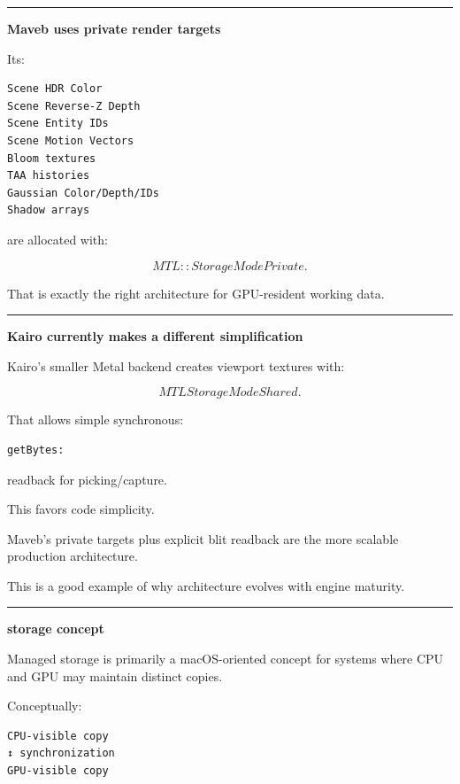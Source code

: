\begin{center}\rule{0.5\linewidth}{0.5pt}\end{center}

\textbf{Maveb uses private render targets}

Its:

\begin{verbatim}
Scene HDR Color
Scene Reverse-Z Depth
Scene Entity IDs
Scene Motion Vectors
Bloom textures
TAA histories
Gaussian Color/Depth/IDs
Shadow arrays
\end{verbatim}

are allocated with:

\[
MTL::StorageModePrivate.
\]

That is exactly the right architecture for GPU-resident working data.

\begin{center}\rule{0.5\linewidth}{0.5pt}\end{center}

\textbf{Kairo currently makes a different simplification}

Kairo's smaller Metal backend creates viewport textures with:

\[
MTLStorageModeShared.
\]

That allows simple synchronous:

\begin{verbatim}
getBytes:
\end{verbatim}

readback for picking/capture.

This favors code simplicity.

Maveb's private targets plus explicit blit readback are the more scalable production architecture.

This is a good example of why architecture evolves with engine maturity.

\begin{center}\rule{0.5\linewidth}{0.5pt}\end{center}

\textbf{ storage concept}

Managed storage is primarily a macOS-oriented concept for systems where CPU and GPU may maintain distinct copies.

Conceptually:

\begin{verbatim}
CPU-visible copy
↕ synchronization
GPU-visible copy
\end{verbatim}

